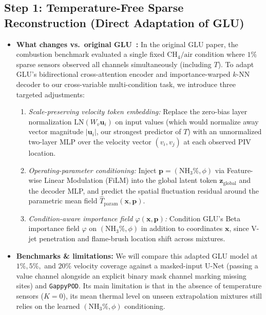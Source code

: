 \documentclass[11pt,letterpaper]{article}
\begin{document}
\subsection*{Step 1: Temperature-Free Sparse Reconstruction (Direct Adaptation of GLU)}
\begin{itemize}
    \item \textbf{What changes vs.\ original GLU~\cite{wang2026glu}:} In the original GLU paper, the combustion benchmark evaluated a single fixed $\text{CH}_4/\text{air}$ condition where $1\%$ sparse sensors observed all channels simultaneously (including $T$). To adapt GLU's bidirectional cross-attention encoder and importance-warped $k$-NN decoder to our cross-variable multi-condition task, we introduce three targeted adjustments:
    \begin{enumerate}
        \item \textit{Scale-preserving velocity token embedding:} Replace the zero-bias layer normalization $\text{LN}(W_v \mathbf{u}_i)$ on input values (which would normalize away vector magnitude $|\mathbf{u}_i|$, our strongest predictor of $T$) with an unnormalized two-layer MLP over the velocity vector $(v_i, v_j)$ at each observed PIV location.
        \item \textit{Operating-parameter conditioning:} Inject $\mathbf{p} = (\text{NH}_3\%, \phi)$ via Feature-wise Linear Modulation (FiLM) into the global latent token $\mathbf{z}_{\text{global}}$ and the decoder MLP, and predict the spatial fluctuation residual around the parametric mean field $\hat{T}_{\text{param}}(\mathbf{x}, \mathbf{p})$.
        \item \textit{Condition-aware importance field $\varphi(\mathbf{x}, \mathbf{p})$:} Condition GLU's Beta importance field $\varphi$ on $(\text{NH}_3\%, \phi)$ in addition to coordinates $\mathbf{x}$, since V-jet penetration and flame-brush location shift across mixtures.
    \end{enumerate}
    \item \textbf{Benchmarks \& limitations:} We will compare this adapted GLU model at $1\%, 5\%,$ and $20\%$ velocity coverage against a masked-input U-Net (passing a value channel alongside an explicit binary mask channel marking missing sites) and \texttt{GappyPOD}. Its main limitation is that in the absence of temperature sensors ($K=0$), its mean thermal level on unseen extrapolation mixtures still relies on the learned $(\text{NH}_3\%, \phi)$ conditioning.
\end{itemize}
\end{document}
